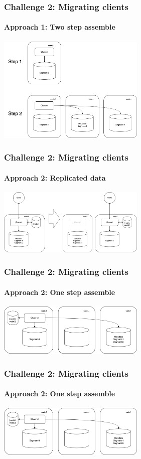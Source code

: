 \documentclass{beamer}
\begin{document}
\begin{frame}
    \frametitle{Challenge 2: Migrating clients}
    \framesubtitle{Approach 1: Two step assemble}

    \begin{center}
        \includegraphics[width=7cm, keepaspectratio]{images/assemble-1.png}
    \end{center}
\end{frame}

\begin{frame}
    \frametitle{Challenge 2: Migrating clients}
    \framesubtitle{Approach 2: Replicated data}

    \begin{center}
        \includegraphics[width=7cm, keepaspectratio]{images/replicated-data.png}
    \end{center}
\end{frame}

\begin{frame}
    \frametitle{Challenge 2: Migrating clients}
    \framesubtitle{Approach 2: One step assemble}

    \begin{center}
        \includegraphics[width=7cm, keepaspectratio]{images/assemble-2.png}
    \end{center}
\end{frame}

\begin{frame}
    \frametitle{Challenge 2: Migrating clients}
    \framesubtitle{Approach 2: One step assemble}

    \begin{center}
        \includegraphics[width=7cm, keepaspectratio]{images/assemble-2.png}
    \end{center}
\end{frame}
\end{document}
